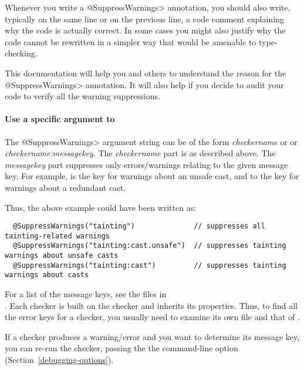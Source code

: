 Whenever you write a \<@SuppressWarnings> annotation, you should also
write, typically on the same line or on the previous line, a code comment
explaining why the code is actually correct.  In some cases you might also
justify why the code cannot be rewritten in a simpler way that would be
amenable to type-checking.

This documentation will help you and others to understand the reason for
the \<@SuppressWarnings> annotation.  It will also help if you decide to
audit your code to verify all the warning suppressions.

\paragraph{Use a specific argument to }

\label{compiler-message-keys}

The \<@SuppressWarnings> argument string can be of the form
\emph{checkername} or
or \emph{checkername:messagekey}.  The \emph{checkername} part is as
described above.  The \emph{messagekey} part suppresses only
errors/warnings relating to the given message key.  For example,
 is the key for warnings about an unsafe cast, and
 to the key for warnings about a redundant cast.

Thus, the above example could have been written as:

\begin{Verbatim}
  @SuppressWarnings("tainting")              // suppresses all tainting-related warnings
  @SuppressWarnings("tainting:cast.unsafe")  // suppresses tainting warnings about unsafe casts
  @SuppressWarnings("tainting:cast")         // suppresses tainting warnings about casts
\end{Verbatim}

\noindent
For a list of the message keys, 
see the  files in 
\\
.
Each checker is built on the  checker and inherits its
properties.  Thus, to find all the error keys for a checker, you usually
need to examine its own  file and that of
.

If a checker produces a warning/error and you want to determine its message
key, you can re-run the checker, passing the the 
command-line option (Section~\ref{debugging-options}).


